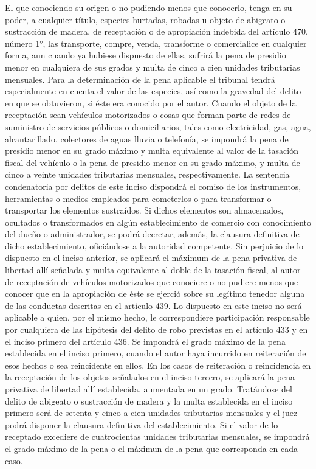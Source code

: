     El que conociendo su origen o no pudiendo menos que conocerlo, tenga en su poder, a cualquier título, especies hurtadas, robadas u objeto de abigeato o sustracción de madera, de receptación o de apropiación indebida del artículo 470, número 1°, las transporte, compre, venda, transforme o comercialice en cualquier forma, aun cuando ya hubiese dispuesto de ellas, sufrirá la pena de presidio menor en cualquiera de sus grados y multa de cinco a cien unidades tributarias mensuales.
    Para la determinación de la pena aplicable el tribunal tendrá especialmente en cuenta el valor de las especies, así como la gravedad del delito en que se obtuvieron, si éste era conocido por el autor.
    Cuando el objeto de la receptación sean vehículos motorizados o cosas que forman parte de redes de suministro de servicios públicos o domiciliarios, tales como electricidad, gas, agua, alcantarillado, colectores de aguas lluvia o telefonía, se impondrá la pena de presidio menor en su grado máximo y multa equivalente al valor de la tasación fiscal del vehículo o la pena de presidio menor en su grado máximo, y multa de cinco a veinte unidades tributarias mensuales, respectivamente. La sentencia condenatoria por delitos de este inciso dispondrá el comiso de los instrumentos, herramientas o medios empleados para cometerlos o para transformar o transportar los elementos sustraídos. Si dichos elementos son almacenados, ocultados o transformados en algún establecimiento de comercio con conocimiento del dueño o administrador, se podrá decretar, además, la clausura definitiva de dicho establecimiento, oficiándose a la autoridad competente.
    Sin perjuicio de lo dispuesto en el inciso anterior, se aplicará el máximum de la pena privativa de libertad allí señalada y multa equivalente al doble de la tasación fiscal, al autor de receptación de vehículos motorizados que conociere o no pudiere menos que conocer que en la apropiación de éste se ejerció sobre su legítimo tenedor alguna de las conductas descritas en el artículo 439. Lo dispuesto en este inciso no será aplicable a quien, por el mismo hecho, le correspondiere participación responsable por cualquiera de las hipótesis del delito de robo previstas en el artículo 433 y en el inciso primero del artículo 436.
    Se impondrá el grado máximo de la pena establecida en el inciso primero, cuando el autor haya incurrido en reiteración de esos hechos o sea reincidente en ellos. En los casos de reiteración o reincidencia en la receptación de los objetos señalados en el inciso tercero, se aplicará la pena privativa de libertad allí establecida, aumentada en un grado.
    Tratándose del delito de abigeato o sustracción de madera y la multa establecida en el inciso primero será de setenta y cinco a cien unidades tributarias mensuales y el juez podrá disponer la clausura definitiva del establecimiento.
    Si el valor de lo receptado excediere de cuatrocientas unidades tributarias mensuales, se impondrá el grado máximo de la pena o el máximun de la pena que corresponda en cada caso.






